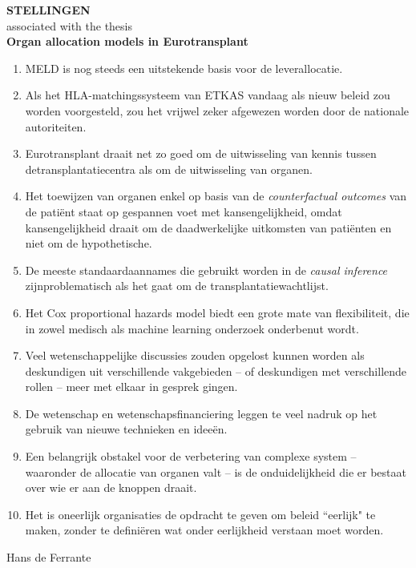 \documentclass[12pt]{article}
\begin{document}
	\vfill
	
	\newpage
	
		\begin{center}
			{\Large \textbf{STELLINGEN}}\\[1em]
			\setmainfont{PT Serif}
			{\large associated with the thesis}\\[1em]
			{\large \textbf{Organ allocation models in Eurotransplant}}\\[0.5em]
		\end{center}
		\vspace{1em}
	
		\begin{enumerate}[leftmargin=1cm, label=\textbf{\arabic*.}]
		\item MELD is nog steeds een uitstekende basis voor de leverallocatie.
		\item Als het HLA-matchingssysteem van ETKAS vandaag als nieuw beleid zou worden voorgesteld, zou het vrijwel zeker afgewezen worden door de nationale autoriteiten.	
		\item Eurotransplant draait net zo goed om de uitwisseling van kennis tussen de\linebreak transplantatiecentra als om de uitwisseling van organen.	
		\item Het toewijzen van organen enkel op basis van de \textit{counterfactual outcomes} van de patiënt staat op gespannen voet met kansengelijkheid, omdat kansengelijkheid draait om de daadwerkelijke uitkomsten van patiënten en niet om de hypothetische.
		\item De meeste standaardaannames die gebruikt worden in de \textit{causal inference} zijn\linebreak problematisch als het gaat om de transplantatiewachtlijst. 
		\item Het Cox proportional hazards model biedt een grote mate van flexibiliteit, die in zowel medisch als machine learning onderzoek onderbenut wordt.
		\item Veel wetenschappelijke discussies zouden opgelost kunnen worden als deskundigen uit verschillende vakgebieden -- of deskundigen met verschillende rollen -- meer met elkaar in gesprek gingen. 
		\item De wetenschap en wetenschapsfinanciering leggen te veel nadruk op het gebruik van nieuwe technieken en ideeën. 
		\item Een belangrijk obstakel voor de verbetering van complexe system -- waaronder de allocatie van organen valt -- is de onduidelijkheid die er bestaat over wie er aan de knoppen draait.
		\item Het is oneerlijk organisaties de opdracht te geven om beleid ``eerlijk" te maken, \linebreak zonder te definiëren wat onder eerlijkheid verstaan moet worden.\\ 

	\end{enumerate}
	\vfill
	\begin{center}
		{\small Hans de Ferrante}
	\end{center}
	
	
\end{document}
